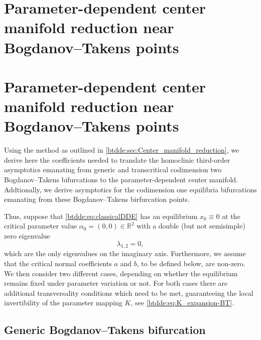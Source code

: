 % 

\ifarxiv
\section{Parameter-dependent center manifold reduction near Bog\-danov--Takens points}
\else
\section{Parameter-dependent center manifold reduction near Bogdanov--Takens points}
\fi
\label{btdde:sec:parameter-dependent-center-manifold-reduction} 
Using the method as outlined in \cref{btdde:sec:Center_manifold_reduction}, we derive
here the coefficients needed to translate the homoclinic third-order asymptotics
emanating from generic and transcritical codimension two Bogdanov--Takens
bifurcations to the parameter-dependent center manifold. Addtionally, we derive
asymptotics for the codimension one equilibria bifurcations emanating from these
Bogdanov--Takens birfurcation points.

Thus, suppose that \cref{btdde:eq:classicalDDE} has an equilibrium $x_0 \equiv 0$ at
the critical parameter value $\alpha_0 = (0,0) \in \mathbb R^2$ with a double
(but not semisimple) zero eigenvalue
\begin{equation}
    \lambda_{1,2} = 0,
\end{equation}
which are the only eigenvalues on the imaginary axis. Furthermore, we assume
that the critical normal coefficients $a$ and $b$, to be defined below, are
non-zero. We then consider two different cases, depending on whether the
equilibrium remains fixed under parameter variation or not. For both cases there
are additional transversality conditions which need to be met, guaranteeing the
local invertibility of the parameter mapping $K$, see \cref{btdde:eq:K_expansion-BT}.

\subsection{Generic Bogdanov--Takens bifurcation}
\label{btdde:sec:generic_bogdanov-takens}

